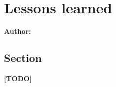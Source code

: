 \chapter{Lessons learned}

\textbf{Author: } 

\section{Section}
\textbf{[TODO]}
\newline
\lipsum[1]

\filbreak